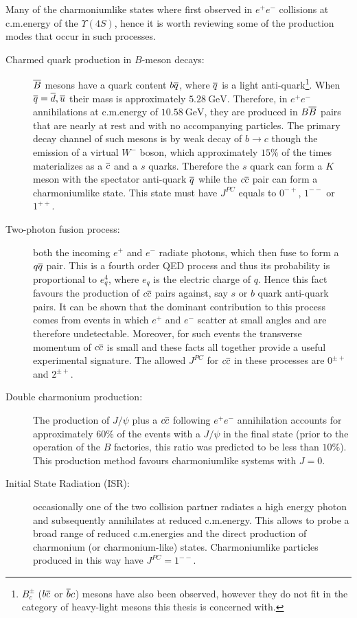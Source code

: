 Many of the charmoniumlike states where first observed in $e^+ e^-$ collisions at c.m.\@ energy of the $\varUpsilon(4S)$, hence it is worth reviewing some of the production modes that occur in such processes. 
\begin{description}
  \item[Charmed quark production in $B$-meson decays: ] $\overline{B}$ mesons have a quark content $b \overline{q}$, where $\overline{q}$ is a light anti-quark\footnote{$B_c^\pm$ ($b \overline{c}$ or $\overline{b} c$) mesons have also been observed, however they do not fit in the category of heavy-light mesons this thesis is concerned with.}. When $\overline{q} = \overline{d}, \overline{u}$ their mass is approximately $5.28 \ \text{GeV}$. Therefore, in $e^+ e^-$ annihilations at c.m.\@ energy of $10.58 \ \text{GeV}$, they are produced in $B \overline{B}$ pairs that are nearly at rest and with no accompanying particles. The primary decay channel of such mesons is by weak decay of $b \to c$ though the emission of a virtual $W^-$ boson, which approximately $15\%$ of the times materializes as a $\overline{c}$ and a $s$ quarks. Therefore the $s$ quark can form a $K$ meson with the spectator anti-quark $\overline{q}$ while the $c \overline{c}$ pair can form a charmoniumlike state. This state must have $J^{P C}$ equals to $0^{- +}$, $1^{- -}$ or $1^{+ +}$. 
  \item[Two-photon fusion process:] both the incoming $e^+$ and $e^-$ radiate photons, which then fuse to form a $q \overline{q}$ pair. This is a fourth order QED process and thus its probability is proportional to $e^4_q$, where $e_q$ is the electric charge of $q$. Hence this fact favours the production of $c \overline{c}$ pairs against, say $s$ or $b$ quark anti-quark pairs. It can be shown that the dominant contribution to this process comes from events in which $e^+$ and $e^-$ scatter at small angles and are therefore undetectable. Moreover, for such events the transverse momentum of $c \overline{c}$ is small and these facts all together provide a useful experimental signature. The allowed $J^{P C}$ for $c \overline{c}$ in these processes are $0^{\pm +}$ and $2^{\pm +}$.
  \item[Double charmonium production:]  The production of $J/\psi$ plus a $c \overline{c}$ following $e^+ e^-$ annihilation accounts for approximately $60\%$ of the events with a $J/\psi$ in the final state (prior to the operation of the $B$ factories, this ratio was predicted to be less than $10\%$). This production method favours charmoniumlike systems with $J = 0$.
  \item[Initial State Radiation (ISR):] occasionally one of the two collision partner radiates a high energy photon and subsequently annihilates at reduced c.m.\@ energy. This allows to probe a broad range of reduced c.m.\@ energies and the direct production of charmonium (or charmonium-like) states. Charmoniumlike particles produced in this way have $J^{P C} = 1^{- -}$.
\end{description}

